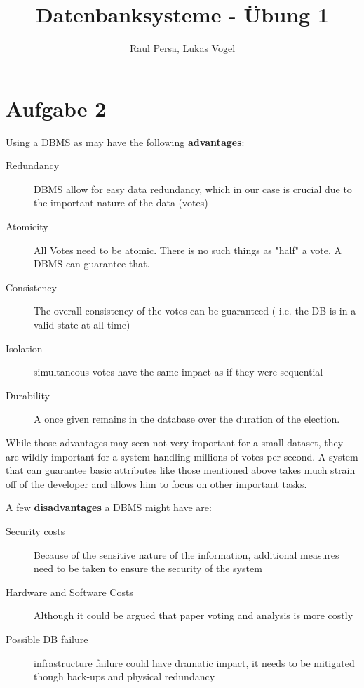\documentclass[10pt,a4paper]{article}
\author{Raul Persa, Lukas Vogel}
\title{Datenbanksysteme - \"Ubung 1}
\begin{document}
\maketitle

\section*{Aufgabe 2}
Using a DBMS as may have the following \textbf{advantages}:
\begin{description}
	\item[Redundancy] DBMS allow for easy data redundancy, which in our case is crucial due to the important nature of the data (votes) 
	
	\item[Atomicity] All Votes need to be atomic. There is no such things as "half" a vote. A DBMS can guarantee that.
	
	\item[Consistency] The overall consistency of the votes can be guaranteed ( i.e. the DB is in a valid state at all time)
	
	\item[Isolation] simultaneous votes have the same impact as if they were sequential
	
	\item[Durability] A once given remains in the database over the duration of the election.
\end{description}
While those advantages may seen not very important for a small dataset, they are wildly important for a system handling millions of votes per second. A system that can guarantee basic attributes like those mentioned above takes much strain off of the developer and allows him to focus on other important tasks.

A few \textbf{disadvantages} a DBMS might have are:
\begin{description}
	\item[Security costs] Because of the sensitive nature of the information, additional measures need to be taken to ensure the security of the system
	\item[Hardware and Software Costs] Although it could be argued that paper voting and analysis is more costly
	\item[Possible DB failure]  infrastructure failure could have dramatic impact, it needs to be mitigated though back-ups and physical redundancy
\end{description}
\end{document}
